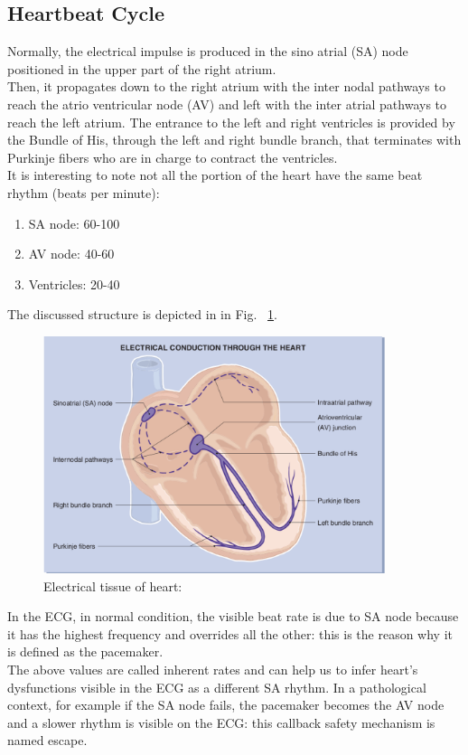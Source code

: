 \documentclass[LaM,binding=0.6cm]{sapthesis}
\begin{document}
\subsection{Heartbeat Cycle}
Normally, the electrical impulse is produced in the sino atrial (SA) node positioned in the upper part of the right atrium.\\Then, it propagates down to the right atrium with the inter nodal pathways to reach the atrio ventricular node (AV) and left with  the inter atrial pathways to reach the left atrium. The entrance to the left and right ventricles is provided by the Bundle of His, through the left and right bundle branch, that terminates with Purkinje fibers who are in charge to contract the ventricles.\\It is interesting to note not all the portion of the heart have the same beat rhythm (beats per minute):
\begin{enumerate}
\item SA node: 60-100  
\item AV node: 40-60 
\item Ventricles: 20-40 
\end{enumerate}
The discussed structure is depicted in in Fig. ~\ref{fig:hearts}.
\begin{figure} \centering
	\includegraphics[width=100mm,scale=0.7]{heartex}
	\caption{Electrical tissue of heart: \cite{ecgbook}}
	\label{fig:hearts}
\end{figure}
In the ECG, in normal condition, the visible beat rate is due to SA node because it has the highest frequency and overrides all the other: this is the reason why it is defined as the pacemaker.\\The above values are called inherent rates and can help us to infer heart's dysfunctions visible in the ECG as a different SA rhythm. In a pathological context, for example if the SA node fails, the pacemaker becomes the AV node and  a slower rhythm is visible on the ECG: this callback safety mechanism is named escape.
\end{document}
